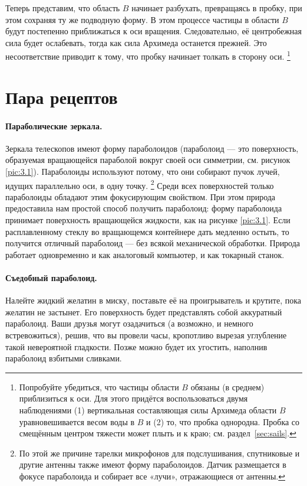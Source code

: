 Теперь представим, что область $B$ начинает разбухать, превращаясь в пробку, при этом сохраняя ту же подводную форму.
В этом процессе частицы в области $B$ будут постепенно приближаться к оси вращения.
Следовательно, её центробежная сила будет ослабевать, тогда как сила Архимеда останется прежней.
Это несоответствие приводит к тому, что пробку начинает толкать в сторону оси.%
\footnote{Попробуйте убедиться, что частицы области $B$ обязаны (в среднем) приблизиться к оси.
Для этого придётся воспользоваться двумя наблюдениями
(1) вертикальная составляющая силы Архимеда области $B$ уравновешивается весом воды в $B$ и
(2) то, что пробка однородна.
Пробка со смещённым центром тяжести может плыть и к краю;
см. раздел~\ref{sec:sails}.
\pr}

\section{Пара рецептов}\label{Пара рецептов}

\paragraph{Параболические зеркала.}
Зеркала телескопов имеют форму параболоидов (параболоид --- это поверхность, образуемая вращающейся параболой вокруг своей оси симметрии, см. рисунок \ref{pic:3.1}).
Параболоиды используют потому, что они собирают пучок лучей, идущих параллельно оси, в одну точку.%
\footnote{По этой же причине тарелки микрофонов для подслушивания, спутниковые и другие антенны также имеют форму параболоидов.
Датчик размещается в фокусе параболоида и собирает все «лучи», отражающиеся от антенны.}
Среди всех поверхностей только параболоиды обладают этим фокусирующим свойством.
При этом природа предоставила нам простой способ получить параболоид: форму параболоида принимает поверхность вращающейся жидкости, как на рисунке \ref{pic:3.1}.
Если расплавленному стеклу во вращающемся контейнере дать медленно остыть, то получится отличный параболоид --- без всякой механической обработки.
Природа работает одновременно и как аналоговый компьютер, и как токарный станок.

\paragraph{Съедобный параболоид.}
Налейте жидкий желатин в миску, поставьте её на проигрыватель и крутите, пока желатин не застынет.
Его поверхность будет представлять собой аккуратный параболоид.
Ваши друзья могут озадачиться (а возможно, и немного встревожиться), решив, что вы провели часы, кропотливо вырезая углубление такой невероятной гладкости.
Позже можно будет их угостить, наполнив параболоид взбитыми сливками.

